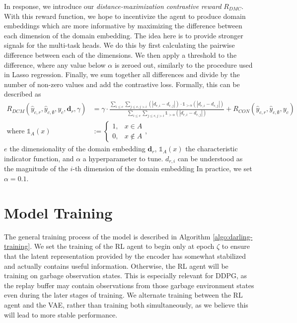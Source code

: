 In response, we introduce our \textit{distance-maximization contrastive reward} $R_{DMC}$.
With this reward function, we hope to incentivize the agent to produce domain embeddings which are more informative by maximizing the difference between each dimension of the domain embedding.
The idea here is to provide stronger signals for the multi-task heads.
We do this by first calculating the pairwise difference between each of the dimensions.
We then apply a threshold to the difference, where any value below $\alpha$ is zeroed out, similarly to the procedure used in Lasso regression.
Finally, we sum together all differences and divide by the number of non-zero values and add the contrastive loss.
Formally, this can be described as
\begin{align}
	R_{DCM} (\hat{y}_{c,r}, \hat{y}_{c,\emptyset}, y_c, \boldsymbol{d}_r, \gamma) &= \gamma \cdot
		\frac{\sum_{i \leq e} \sum_{j \leq e, j > i} \left(|d_{r,i} - d_{r,j}|\right) \cdot \mathds{1}_{>\alpha}\left(|d_{r,i} - d_{r,j}|\right)}
		     {\sum_{i \leq e} \sum_{j \leq e, j > i} \mathds{1}_{>\alpha}\left(|d_{r,i} - d_{r,j}|\right)}
		+ R_{CON}(\hat{y}_{c,r}, \hat{y}_{c,\emptyset}, y_c) \\
	\text{where } \mathds{1}_A(x) &:= \begin{cases}
		1, & x \in A\\
		0, & x \notin A
	\end{cases},
\end{align}
$e$ the dimensionality of the domain embedding $\boldsymbol{d}_r$, $\mathds{1}_{A}(x)$ the characteristic indicator function, and $\alpha$ a hyperparameter to tune.
$d_{r,i}$ can be understood as the magnitude of the $i$-th dimension of the domain embedding
In practice, we set $\alpha = 0.1$.

\section{Model Training}\label{sec:methodology-training}

The general training process of the model is described in Algorithm \ref{algo:darling-training}.
We set the training of the RL agent to begin only at epoch $\zeta$ to ensure that the latent representation provided by the encoder has somewhat stabilized and actually contains useful information.
Otherwise, the RL agent will be training on garbage observation states.
This is especially relevant for DDPG, as the replay buffer may contain observations from those garbage environment states even during the later stages of training.
We alternate training between the RL agent and the VAE, rather than training both simultaneously, as we believe this will lead to more stable performance.

